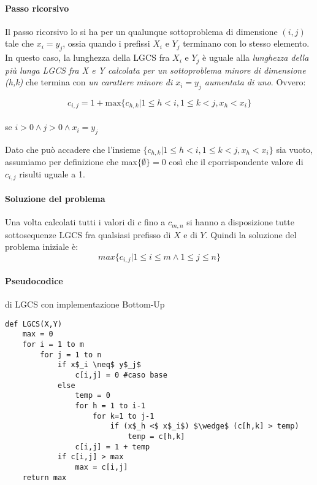 \paragraph*{Passo ricorsivo}
Il passo ricorsivo lo si ha per un qualunque sottoproblema di dimensione $(i,j)$ tale che $x_i = y_j$, ossia quando i prefissi $X_i$ e $Y_j$ terminano con lo stesso elemento.
\\In questo caso, la lunghezza della LGCS fra $X_i$ e $Y_j$ è uguale alla \emph{lunghezza della più lunga LGCS fra X e Y calcolata per un sottoproblema minore di dimensione (h,k)}
che termina con \emph{un carattere minore di $x_i = y_j$ aumentata di uno}.
Ovvero:

\begin{center}
	$$c_{i,j} = 1 + \text{max}\{c_{h,k} | 1 \leq h < i, 1 \leq k < j, x_h < x_i\}$$
	\\se $i>0\wedge j>0 \wedge x_i = y_j$
\end{center}

Dato che può accadere che l'insieme $\{c_{h,k} | 1 \leq h < i, 1 \leq k < j, x_h < x_i\}$ sia vuoto, assumiamo per definizione che max$\{\emptyset\} = 0$
così che il cporrispondente valore di $c_{i,j}$ risulti uguale a 1.

\paragraph*{Soluzione del problema}
Una volta calcolati tutti i valori di $c$ fino a $c_{m,n}$ si hanno a disposizione tutte sottosequenze LGCS fra qualsiasi prefisso di $X$ e di $Y$.
Quindi la soluzione del problema iniziale è:
\begin{equation*}
	max\{c_{i,j} | 1\leq i\leq m \wedge 1 \leq j \leq n \}
\end{equation*}

\paragraph*{Pseudocodice} di LGCS con implementazione Bottom-Up

\begin{lstlisting}
def LGCS(X,Y)
	max = 0
	for i = 1 to m
		for j = 1 to n
			if x$_i \neq$ y$_j$
				c[i,j] = 0 #caso base
			else
				temp = 0
				for h = 1 to i-1
					for k=1 to j-1
						if (x$_h <$ x$_i$) $\wedge$ (c[h,k] > temp)
							temp = c[h,k]
				c[i,j] = 1 + temp
			if c[i,j] > max
				max = c[i,j]
	return max
\end{lstlisting}